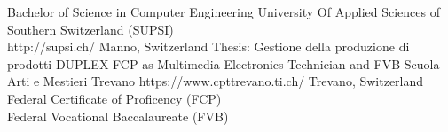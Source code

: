 \begin{CV}
    {Bachelor of Science in Computer Engineering}
    {\small University Of Applied Sciences of Southern Switzerland (SUPSI)\\}
    {http://supsi.ch/}
    {Manno, Switzerland}
    {Thesis: Gestione della produzione di prodotti DUPLEX}
    {FCP as Multimedia Electronics Technician and FVB}
    {Scuola Arti e Mestieri Trevano}
    {https://www.cpttrevano.ti.ch/}
    {Trevano, Switzerland}
    {Federal Certificate of Proficency (FCP)\\Federal Vocational Baccalaureate (FVB)}
\end{CV}
